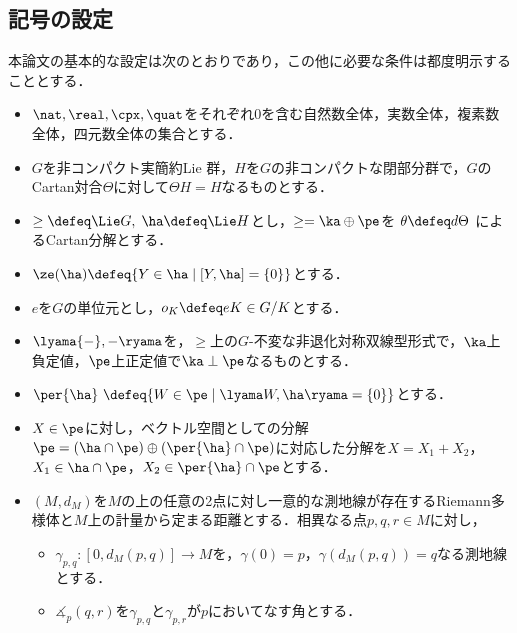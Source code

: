 
\subsection{記号の設定}
本論文の基本的な設定は次のとおりであり，この他に必要な条件は都度明示することとする．

\begin{nttdef}
  \leavevmode\vspace{-1em}
  \begin{itemize}
  \item $\nat,\real, \cpx,\quat$をそれぞれ0を含む自然数全体，実数全体，複素数全体，四元数全体の集合とする．
  \item $G$を非コンパクト実簡約Lie 群，$H$を$G$の非コンパクトな閉部分群で，$G$のCartan対合$\Theta$に対して$\Theta H = H$なるものとする．
  \item $\ge \defeq \Lie G,\; \ha \defeq \Lie H$とし，$\ge = \ka\oplus \pe$を $\theta \defeq d\Theta$ によるCartan分解とする．
  \item $\ze(\ha)\defeq \{Y\in \ha\mid [Y,\ha] = \{0\} \} $とする．
  \item $e$を$G$の単位元とし，$o_K \defeq eK\in G/K$とする．
  \item $\lyama{-},{-} \ryama$を，$\ge$上の$G$-不変な非退化対称双線型形式で，$\ka$上負定値，$\pe$上正定値で$\ka\perp \pe$なるものとする．
  \item $\per{\ha}\ \defeq \{W\in \pe\mid \lyama W, \ha\ryama = \{0\}\} $とする．
  \item $X\in \pe$に対し，ベクトル空間としての分解$\pe =( \ha\cap \pe)\oplus(\per{\ha}\cap \pe) $に対応した分解を$X = X_1 + X_2 $，$X_1 \in \ha\cap \pe$，$X_2\in \per{\ha}\cap \pe$とする．
  \item $(M,d_M)$を$M$の上の任意の2点に対し一意的な測地線が存在するRiemann多様体と$M$上の計量から定まる距離とする．相異なる点$p,q,r \in M$に対し，
    \begin{itemize}
    \item $\gamma_{p,q}\colon [0, d_{M}(p,q)] \to M$を，$\gamma(0) =  p$，$\gamma(d_{M}(p,q)) = q $なる測地線とする．
    \item $\measuredangle_{p}(q, r)$を$\gamma_{p,q} $と$\gamma_{p,r} $が$p$においてなす角とする．
    \end{itemize}
  \end{itemize}  
\end{nttdef}

